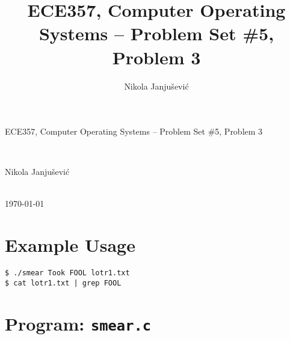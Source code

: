 \documentclass[11pt,a4paper]{article}
\author{Nikola Janju\v{s}evi\'{c}}
\title{ECE357, Computer Operating Systems -- Problem Set \#5, Problem 3}
\begin{document}
\begin{Large}
ECE357, Computer Operating Systems -- Problem Set \#5, Problem 3
\end{Large} \\
\begin{large}
Nikola Janju\v{s}evi\'{c}
\end{large} 
\\
\today

\section{Example Usage}
\verb|$ ./smear Took FOOL lotr1.txt| \\
\verb=$ cat lotr1.txt | grep FOOL=


\pagebreak

\section*{Program: \texttt{smear.c}}

\end{document}
